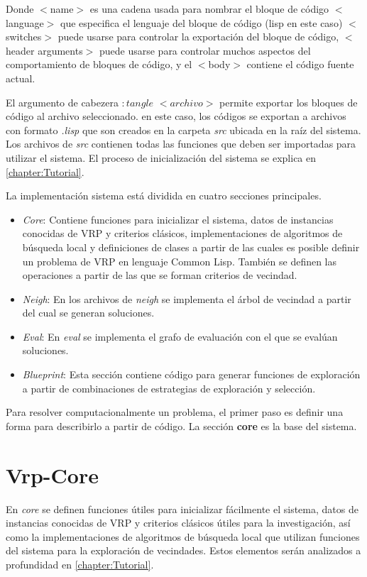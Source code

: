 Donde $<$name$>$ es una cadena usada para nombrar el bloque de código $<$language$>$ que especifica el lenguaje del bloque de código (lisp en este caso) $<$switches$>$ puede usarse para controlar la exportación del bloque de código, $<$header arguments$>$ puede usarse para controlar muchos aspectos del comportamiento de bloques de código, y el $<$body$>$ contiene el código fuente actual.

El argumento de cabezera $:tangle$ $<archivo>$ permite exportar los bloques de código al archivo seleccionado. en este caso, los códigos se exportan a archivos con formato \textit{.lisp} que son creados en la carpeta \textit{src} ubicada en la raíz del sistema. Los archivos de \textit{src} contienen todas las funciones que deben ser importadas para utilizar el sistema. El proceso de inicialización del sistema se explica en \ref{chapter:Tutorial}.

La implementación sistema está dividida en cuatro secciones principales.

\begin{itemize}
	\item \textit{Core}: Contiene funciones para inicializar el sistema, datos de instancias conocidas de VRP y criterios clásicos, implementaciones de algoritmos de búsqueda local y definiciones de clases a partir de las cuales es posible definir un problema de VRP en lenguaje Common Lisp. También se definen las operaciones a partir de las que se forman criterios de vecindad.
	\item \textit{Neigh}: En los archivos de \textit{neigh} se implementa el árbol de vecindad a partir del cual se generan soluciones.
	\item \textit{Eval}: En \textit{eval} se implementa el grafo de evaluación con el que se evalúan soluciones.
	\item \textit{Blueprint}: Esta sección contiene código para generar funciones de exploración a partir de combinaciones de estrategias de exploración y selección.
\end{itemize}

Para resolver computacionalmente un problema, el primer paso es definir una forma para describirlo a partir de código. La sección \textbf{core} es la base del sistema. 


\section{Vrp-Core}\label{2-core}

En \textit{core} se definen funciones útiles para inicializar fácilmente el sistema, datos de instancias conocidas de VRP y criterios clásicos útiles para la investigación, así como la implementaciones de algoritmos de búsqueda local que utilizan funciones del sistema para la exploración de vecindades. Estos elementos serán analizados a profundidad en \ref{chapter:Tutorial}.

